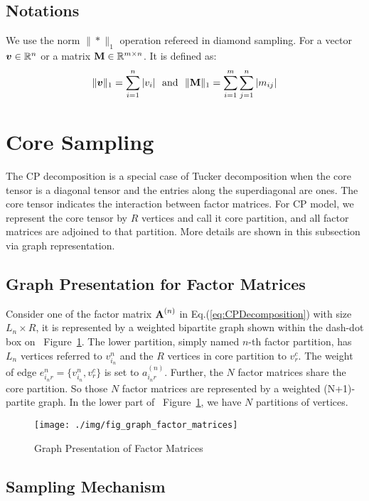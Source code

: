 \documentclass[letterpaper]{article}
\newcommand{\V}[1]{{\boldsymbol{{\MakeLowercase{#1}}}}}
\newcommand{\M}[1]{{\textbf{{\MakeUppercase{#1}}}}}
\newcommand{\Mn}[2]{\M{#1}^{(#2)}}
\newcommand{\norm}[2]{\|#1\|_{#2}}
\newcommand{\Eqn}[1]   {Eq.(\ref{eq:#1})}
\newcommand{\Fig}[1]   {Figure~\ref{fig:#1}}
\begin{document}
\subsection{Notations}

We use the norm $\norm{*}{1}$ operation refereed in diamond sampling.
For a vector $\V{v}\in \mathbb{R}^n$ or a matrix $\M{M}\in \mathbb{R}^{m\times n}$.
It is defined as:
\[
    \norm{\V{v}}{1} = \sum_{i=1}^{n}|v_i|
    \ \  {\rm and} \ \
    \norm{\M{M}}{1} = \sum_{i=1}^{m}\sum_{j=1}^{n}|m_{ij}|
\]


\section{Core Sampling}
The CP decomposition is a special case of Tucker decomposition
when the core tensor is a diagonal tensor and the entries along the superdiagonal are ones.
The core tensor indicates the interaction between factor matrices.
For CP model, we represent the core tensor by $R$ vertices and call it core partition,
and all factor matrices are adjoined to that partition.
More details are shown in this subsection via graph representation.

\subsection{Graph Presentation for Factor Matrices}
Consider one of the factor matrix $\Mn{A}{n}$ in \Eqn{CPDecomposition}
with size $L_n \times R$,
it is represented by a weighted bipartite graph shown within the dash-dot box on ~\Fig{GraphMatrices}.
The lower partition, simply named $n$-th factor partition, has $L_n$ vertices referred to $v^n_{i_n}$
and the $R$ vertices in core partition to $v^c_r$.
The weight of edge $e^n_{i_nr} = \{v^{n}_{i_n},v^c_r\}$ is set to $a^{(n)}_{i_nr}$.
Further, the $N$ factor matrices share the core partition.
So those $N$ factor matrices are represented by a weighted (N+1)-partite graph.
In the lower part of ~\Fig{GraphMatrices}, we have $N$ partitions of vertices.
\begin{figure}[t]
  \centering
  \texttt{[image: ./img/fig\_graph\_factor\_matrices]}\\
  \caption{Graph Presentation of Factor Matrices}
  \label{fig:GraphMatrices}
\end{figure}
\subsection{Sampling Mechanism}
\end{document}
